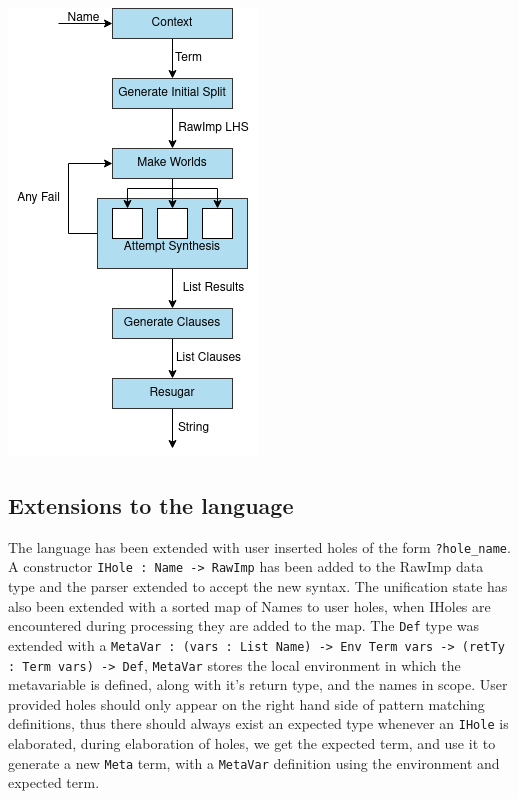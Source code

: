 \documentclass[a4paper]{article}
\newenvironment{Figure}
  {\par\medskip\noindent\minipage{\linewidth}}
  {\endminipage\par\medskip}
\begin{document}
\begin{multicols}{2}
\begin{Figure}
\centering
\includegraphics[scale=0.6]{./Resource/worlds.png}
\end{Figure}
\end{multicols}


\subsection{Extensions to the language}
\label{sec:org92a89c9}
The language has been extended with user inserted holes of the form \texttt{?hole\_name}. 
A constructor \texttt{IHole : Name -> RawImp} has been added to the RawImp 
data type and the parser extended to accept the new syntax. The 
unification state has also been extended with a sorted map of Names
to user holes, when IHoles are encountered during processing they are 
added to the map. The \texttt{Def} type was extended with a 
\texttt{MetaVar : (vars : List Name) -> Env Term vars -> (retTy : Term vars) -> Def}, 
\texttt{MetaVar} stores the local environment in which the metavariable is 
defined, along with it's return type, and the names in scope.
User provided holes should only appear on the right hand side of 
pattern matching definitions, thus there should always exist an expected 
type whenever an \texttt{IHole} is elaborated, during elaboration of holes, we get
the expected term, and use it to generate a new \texttt{Meta} term, with a
\texttt{MetaVar} definition using the environment and expected term.
\end{document}
